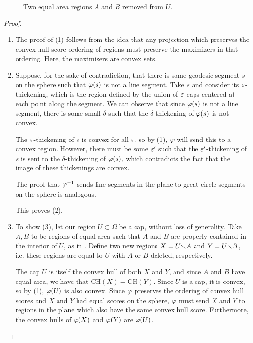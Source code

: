 \begin{figure}[h]
	\centering
	
	\caption{Two equal area regions $A$ and $B$ removed from $U$.}
	\label{fig:ch_schema}
\end{figure}



\begin{proof}
	\ \\
	
	\vspace*{-2em}
	\begin{enumerate}
		\item[] The proof of (1) follows from the idea that any projection which preserves the convex hull score ordering of regions must 
		preserve the maximizers in that ordering.   Here, the maximizers are convex sets.
		
		\item[]  Suppose, for the sake of contradiction, that there is some geodesic segment $s$ on the sphere such that $\varphi(s)$ is not a line segment. Take $s$ and 
		consider its $\varepsilon$-thickening, which is the region defined by the union of $\varepsilon$ caps centered at each point 
		along the segment.  We can observe that since $\varphi(s)$ is not a line segment, there is some small $\delta$ such that the $\delta$-thickening of $\varphi(s)$ is not convex.  
		
		The $\varepsilon$-thickening of $s$ is convex for all $\varepsilon$, so by (1), $\varphi$ will send this to a convex region.  However, there must be some $\varepsilon'$ such that the $\varepsilon'$-thickening of $s$ is sent to the $\delta$-thickening of $\varphi(s)$, which contradicts the fact that the image of these thickenings are convex.
		
		The proof that $\varphi^{-1}$ sends line segments in the plane to great circle segments on the sphere is analogous.  
		
		This proves (2).
		
		
		
\item[] To show (3), let our region $U\subset\Omega$ be a cap, without loss of generality.  Take $A,B$ to be regions of equal area such that $A$ and $B$ are properly contained in the interior of $U$, as in .  Define two new regions $X=U{\smallsetminus} A$ and $Y=U{\smallsetminus} B$, i.e. these regions are equal to $U$ with $A$ or $B$ deleted, respectively.  

The cap $U$ is itself the convex hull of both $X$ and $Y$, and since $A$ and $B$ have equal area, we have that $\mathrm{CH}(X) = \mathrm{CH}(Y)$.  Since $U$ is a cap, it is convex, so by (1), $\varphi(U)$ is also convex.  Since $\varphi$ preserves the ordering of convex hull scores and $X$ and $Y$ had equal scores on the sphere, $\varphi$ must send $X$ and $Y$ to regions in the plane which also have the same convex hull score.  Furthermore, the convex hulls of $\varphi(X)$ and $\varphi(Y)$ are $\varphi(U)$.


\end{enumerate}
\end{proof}
